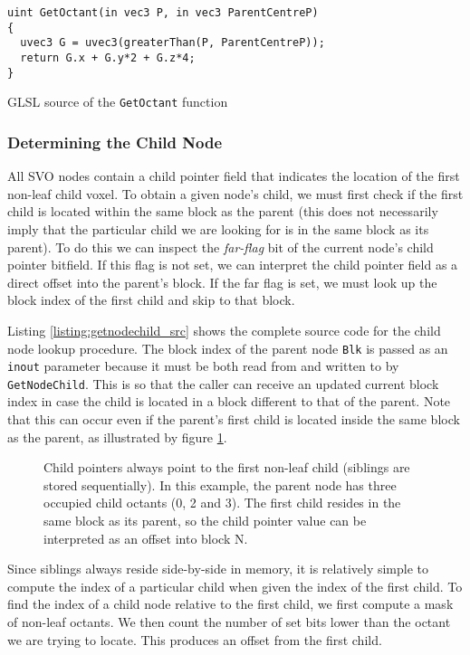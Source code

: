 \begin{listing}[ht]
\small
\begin{verbatim}
uint GetOctant(in vec3 P, in vec3 ParentCentreP)
{
  uvec3 G = uvec3(greaterThan(P, ParentCentreP));
  return G.x + G.y*2 + G.z*4;
}

\end{verbatim}
\caption{GLSL source of the \texttt{GetOctant} function}
\label{listing:getoctant_src}
\end{listing}

\subsubsection{Determining the Child Node}
All SVO nodes contain a child pointer field that indicates the location of the first non-leaf child voxel. To obtain a given node's child, we must first check if the first child is located within the same block as the parent (this does not necessarily imply that the particular child we are looking for is in the same block as its parent). To do this we can inspect the \textit{far-flag} bit of the current node's child pointer bitfield. If this flag is not set, we can interpret the child pointer field as a direct offset into the parent's block. If the far flag is set, we must look up the block index of the first child and skip to that block.

Listing \ref{listing:getnodechild_src} shows the complete source code for the child node lookup procedure. The block index of the parent node \texttt{Blk} is passed as an \texttt{inout} parameter because it must be both read from and written to by \texttt{GetNodeChild}. This is so that the caller can receive an updated current block index in case the child is located in a block different to that of the parent. Note that this can occur even if the parent's first child is located inside the same block as the parent, as illustrated by figure \ref{fig:child_ptr_lookup}.

\begin{figure}[ht]
\footnotesize
    \centering
    
    \caption{Child pointers always point to the first non-leaf child (siblings are stored sequentially). In this example, the parent node has three occupied child octants (0, 2 and 3). The first child resides in the same block as its parent, so the child pointer value can be interpreted as an offset into block N.}
    \label{fig:child_ptr_lookup}
\end{figure}
Since siblings always reside side-by-side in memory, it is relatively simple to compute the index of a particular child when given the index of the first child. To find the index of a child node relative to the first child, we first compute a mask of non-leaf octants. We then count the number of set bits lower than the octant we are trying to locate. This produces an offset from the first child.

